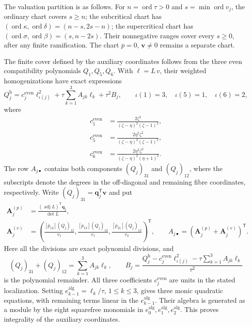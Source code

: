 \documentclass[11pt,a4paper]{article}
\numberwithin{equation}{section}
\theoremstyle{plain}
\theoremstyle{definition}
\theoremstyle{remark}
\begin{document}
The valuation partition is as follows.
For $n=\operatorname{ord}\tau>0$ and
$s=\min\operatorname{ord}v_j$, the ordinary chart covers $s\ge n$;
the subcritical chart has
$(\operatorname{ord}\kappa,\operatorname{ord}\delta)=(n-s,2s-n)$;
the supercritical chart has
$(\operatorname{ord}\sigma,\operatorname{ord}\beta)=(s,n-2s)$.
Their nonnegative ranges cover every $s\ge0$, after any finite
ramification. The chart $\overline p=0$, $\boldsymbol v\ne0$ remains a separate chart.

The finite cover defined by the auxiliary coordinates follows from the three even compatibility polynomials $Q_1,Q_5,Q_6$. With
$\ell=L\,v$, their weighted homogenizations have exact expressions
\[
 Q_j^{\mathrm h}
   =c_j^{\mathrm{even}}\ell_{\iota(j)}^2
       +\tau\sum_{k=1}^3 A_{jk}\ell_k+\tau^2B_j,
 \qquad \iota(1)=3,\quad\iota(5)=1,\quad\iota(6)=2,
\]
where
\[
 \begin{aligned}
 c_1^{\mathrm{even}}&=\frac{2\zeta ^2}{(\zeta -\eta )^2(\zeta -1)^2},\\
 c_5^{\mathrm{even}}&=\frac{2\eta ^2\zeta ^2}{(\zeta -\eta )^2(\zeta -1)^2},\\
 c_6^{\mathrm{even}}&=\frac{2\eta ^2\zeta ^2}{(\zeta -\eta )^2(\eta +1)^2}.
 \end{aligned}
\]
The row $A_{j\bullet}$ contains both components
$(Q_j)_{31}$ and $(Q_j)_{12}$, where the subscripts denote the
degrees in the off-diagonal and remaining fibre coordinates, respectively.
Write $(Q_j)_{31}=\boldsymbol q_j^{\mathsf T}\boldsymbol v$ and put
\[
 \begin{aligned}
 \boldsymbol A_j^{(p)}
   &=\frac{(\operatorname{adj}L)^{\mathsf T}\boldsymbol q_j}{\det L},\\
 \boldsymbol A_j^{(v)}
   &=\left(\frac{[\overline p_{12}](Q_j)_{12}}{v_1},
           \frac{[\overline p_{13}](Q_j)_{12}}{v_1},
           \frac{[\overline p_{21}](Q_j)_{12}}{v_2}\right)^{\mathsf T},
 \qquad A_{j\bullet}=(\boldsymbol A_j^{(p)}+
                      \boldsymbol A_j^{(v)})^{\mathsf T}.
 \end{aligned}
\]
Here all the divisions are exact polynomial divisions, and
\[
 (Q_j)_{31}+(Q_j)_{12}=\sum_{k=1}^3A_{jk}\ell_k,
 \qquad
 B_j=\frac{Q_j^{\mathrm h}-c_j^{\mathrm{even}}\ell_{\iota(j)}^2
                 -\tau\sum_{k=1}^3A_{jk}\ell_k}{\tau^2}
\]
is the polynomial remainder.
All three coefficients $c_j^{\mathrm{even}}$ are units in the
stated localization. Setting $e_{k-1}^{\mathrm{alg}}=\ell_k/\tau$, $1\le k\le3$, gives
three monic quadratic equations, with remaining terms linear in
the $e_{k-1}^{\mathrm{alg}}$. Their algebra is generated as a module by the eight
squarefree monomials in $e_0^{\mathrm{alg}},e_1^{\mathrm{alg}},e_2^{\mathrm{alg}}$. This proves integrality
of the auxiliary coordinates.
\end{document}
